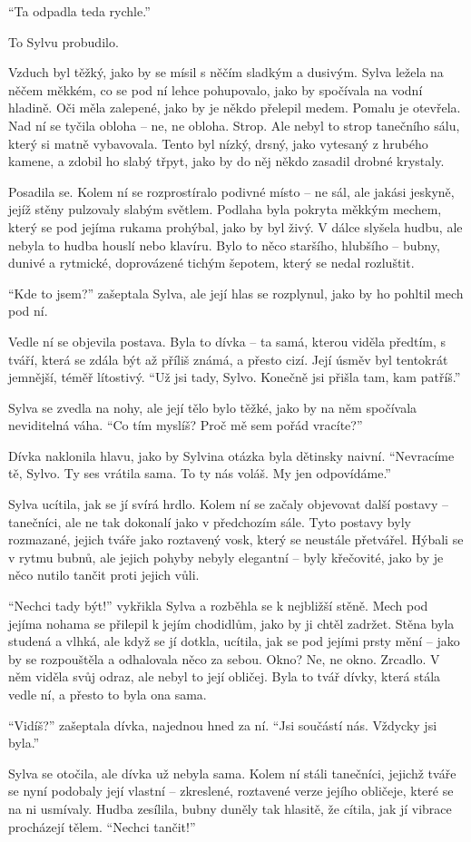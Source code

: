 \documentclass[10pt]{article}
\begin{document}
\begin{spacing}{1}
	\enquote{Ta odpadla teda rychle.}\par To Sylvu probudilo.\par Vzduch byl těžký, jako by se mísil s něčím sladkým a dusivým. Sylva ležela na něčem měkkém, co se pod ní lehce pohupovalo, jako by spočívala na vodní hladině. Oči měla zalepené, jako by je někdo přelepil medem. Pomalu je otevřela. Nad ní se tyčila obloha – ne, ne obloha. Strop. Ale nebyl to strop tanečního sálu, který si matně vybavovala. Tento byl nízký, drsný, jako vytesaný z hrubého kamene, a zdobil ho slabý třpyt, jako by do něj někdo zasadil drobné krystaly.\par Posadila se. Kolem ní se rozprostíralo podivné místo – ne sál, ale jakási jeskyně, jejíž stěny pulzovaly slabým světlem. Podlaha byla pokryta měkkým mechem, který se pod jejíma rukama prohýbal, jako by byl živý. V dálce slyšela hudbu, ale nebyla to hudba houslí nebo klavíru. Bylo to něco staršího, hlubšího – bubny, dunivé a rytmické, doprovázené tichým šepotem, který se nedal rozluštit.\par \enquote{Kde to jsem?} zašeptala Sylva, ale její hlas se rozplynul, jako by ho pohltil mech pod ní.\par Vedle ní se objevila postava. Byla to dívka – ta samá, kterou viděla předtím, s tváří, která se zdála být až příliš známá, a přesto cizí. Její úsměv byl tentokrát jemnější, téměř lítostivý. \enquote{Už jsi tady, Sylvo. Konečně jsi přišla tam, kam patříš.}\par Sylva se zvedla na nohy, ale její tělo bylo těžké, jako by na něm spočívala neviditelná váha. \enquote{Co tím myslíš? Proč mě sem pořád vracíte?}\par Dívka naklonila hlavu, jako by Sylvina otázka byla dětinsky naivní. \enquote{Nevracíme tě, Sylvo. Ty ses vrátila sama. To ty nás voláš. My jen odpovídáme.}\par Sylva ucítila, jak se jí svírá hrdlo. Kolem ní se začaly objevovat další postavy – tanečníci, ale ne tak dokonalí jako v předchozím sále. Tyto postavy byly rozmazané, jejich tváře jako roztavený vosk, který se neustále přetvářel. Hýbali se v rytmu bubnů, ale jejich pohyby nebyly elegantní – byly křečovité, jako by je něco nutilo tančit proti jejich vůli.\par \enquote{Nechci tady být!} vykřikla Sylva a rozběhla se k nejbližší stěně. Mech pod jejíma nohama se přilepil k jejím chodidlům, jako by ji chtěl zadržet. Stěna byla studená a vlhká, ale když se jí dotkla, ucítila, jak se pod jejími prsty mění – jako by se rozpouštěla a odhalovala něco za sebou. Okno? Ne, ne okno. Zrcadlo. V něm viděla svůj odraz, ale nebyl to její obličej. Byla to tvář dívky, která stála vedle ní, a přesto to byla ona sama.\par \enquote{Vidíš?} zašeptala dívka, najednou hned za ní. \enquote{Jsi součástí nás. Vždycky jsi byla.}\par Sylva se otočila, ale dívka už nebyla sama. Kolem ní stáli tanečníci, jejichž tváře se nyní podobaly její vlastní – zkreslené, roztavené verze jejího obličeje, které se na ni usmívaly. Hudba zesílila, bubny duněly tak hlasitě, že cítila, jak jí vibrace procházejí tělem. \enquote{Nechci tančit!} 
\end{spacing}
\end{document}
